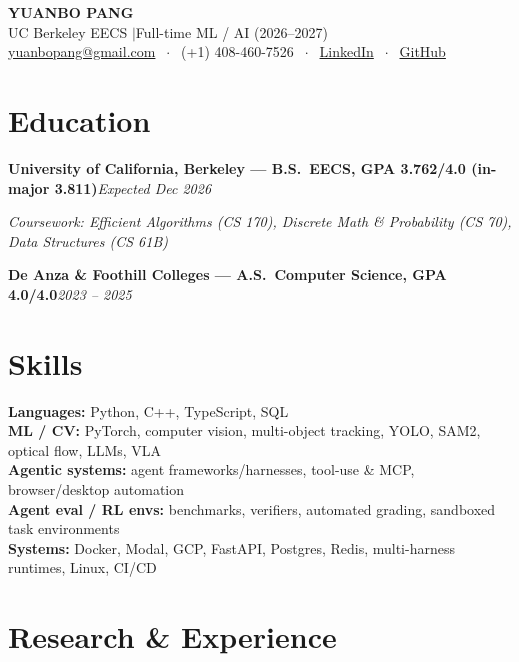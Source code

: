 \documentclass[10pt, letterpaper]{article}
\newcommand{\role}[2]{%
  \vspace{3pt}%
  \noindent\textbf{#1}\hfill\textit{#2}\par
}
\newcommand{\rolesub}[1]{%
  \noindent\textit{#1}\par\vspace{0.5pt}%
}
\begin{document}
\begin{center}
  {\LARGE\bfseries YUANBO PANG}\\[2pt]
  {\large UC Berkeley EECS \quad$\vert$\quad Full-time ML / AI (2026--2027)}\\[2pt]
  \href{mailto:yuanbopang@gmail.com}{yuanbopang@gmail.com}
  $\;\cdot\;$ (+1) 408-460-7526
  $\;\cdot\;$ \href{https://www.linkedin.com/in/yuanbopang/}{LinkedIn}
  $\;\cdot\;$ \href{https://github.com/yuanboP}{GitHub}
\end{center}

\section{Education}
\role{University of California, Berkeley --- B.S.\ EECS, GPA 3.762/4.0 (in-major 3.811)}{Expected Dec 2026}
\rolesub{Coursework: Efficient Algorithms (CS 170), Discrete Math \& Probability (CS 70), Data Structures (CS 61B)}
\role{De Anza \& Foothill Colleges --- A.S.\ Computer Science, GPA 4.0/4.0}{2023 -- 2025}

\section{Skills}
\textbf{Languages:} Python, C++, TypeScript, SQL\\[0.5pt]
\textbf{ML / CV:} PyTorch, computer vision, multi-object tracking, YOLO, SAM2, optical flow, LLMs, VLA\\[0.5pt]
\textbf{Agentic systems:} agent frameworks/harnesses, tool-use \& MCP, browser/desktop automation\\[0.5pt]
\textbf{Agent eval / RL envs:} benchmarks, verifiers, automated grading, sandboxed task environments\\[0.5pt]
\textbf{Systems:} Docker, Modal, GCP, FastAPI, Postgres, Redis, multi-harness runtimes, Linux, CI/CD

\section{Research \& Experience}
\end{document}
